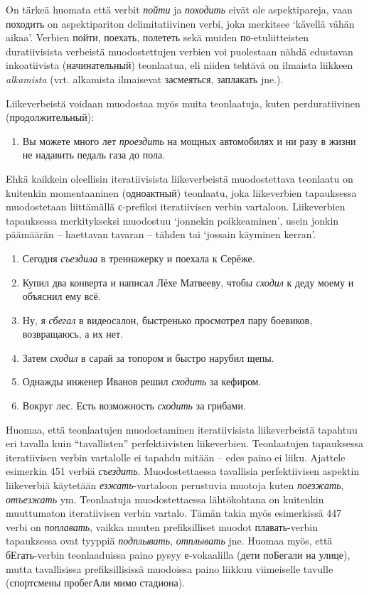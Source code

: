 \documentclass[]{scrartcl}
\providecommand{\tightlist}{%
  \setlength{\itemsep}{0pt}\setlength{\parskip}{0pt}}
\begin{document}
On tärkeä huomata että verbit \emph{пойти} ja \emph{походить} eivät ole
aspektipareja, vaan походить on aspektipariton delimitatiivinen verbi,
joka merkitsee `kävellä vähän aikaa'. Verbien пойти, поехать, полететь
sekä muiden по-etuliitteisten duratiivisista verbeistä muodostettujen
verbien voi puolestaan nähdä edustavan inkoatiivista (начинательный)
teonlaatua, eli niiden tehtävä on ilmaista liikkeen \emph{alkamista}
(vrt. alkamista ilmaisevat засмеяться, заплакать jne.).

Liikeverbeistä voidaan muodostaa myös muita teonlaatuja, kuten
perduratiivinen (продолжительный):

\begin{enumerate}
\def\labelenumi{(\arabic{enumi})}
\setcounter{enumi}{449}
\tightlist
\item
  Вы можете много лет \emph{проездить} на мощных автомобилях и ни разу в
  жизни не надавить педаль газа до пола.
\end{enumerate}

Ehkä kaikkein oleellisin iteratiivisista liikeverbeistä muodostettava
teonlaatu on kuitenkin momentaaninen (одноактный) teonlaatu, joka
liikeverbien tapauksessa muodostetaan liittämällä с-prefiksi
iteratiivisen verbin vartaloon. Liikeverbien tapauksessa merkitykseksi
muodostuu `jonnekin poikkeaminen', usein jonkin päämäärän -- haettavan
tavaran -- tähden tai `jossain käyminen kerran'.

\begin{enumerate}
\def\labelenumi{(\arabic{enumi})}
\setcounter{enumi}{450}
\tightlist
\item
  Сегодня \emph{съездила} в треннажерку и поехала к Серёже.
\item
  Купил два конверта и написал Лёхе Матвееву, чтобы \emph{сходил} к деду
  моему и объяснил ему всё.
\item
  Ну, я \emph{сбегал} в видеосалон, быстренько просмотрел пару боевиков,
  возвращаюсь, а их нет.
\item
  Затем \emph{сходил} в сарай за топором и быстро нарубил щепы.
\item
  Однажды инженер Иванов решил \emph{сходить} за кефиром.
\item
  Вокруг лес. Есть возможность \emph{сходить} за грибами.
\end{enumerate}

Huomaa, että teonlaatujen muodostaminen iteratiivisista liikeverbeistä
tapahtuu eri tavalla kuin ``tavallisten'' perfektiivisten liikeverbien.
Teonlaatujen tapauksessa iteratiivisen verbin vartalolle ei tapahdu
mitään -- edes paino ei liiku. Ajattele esimerkin 451 verbiä
\emph{съездить}. Muodostettaessa tavallisia perfektiivisen aspektin
liikeverbiä käytetään \emph{езжать}-vartaloon perustuvia muotoja kuten
\emph{поезжать}, \emph{отъезжать} ym. Teonlaatuja muodostettaessa
lähtökohtana on kuitenkin muuttumaton iteratiivisen verbin vartalo.
Tämän takia myös esimerkissä 447 verbi on \emph{поплавать}, vaikka
muuten prefiksilliset muodot плавать-verbin tapauksessa ovat tyyppiä
\emph{подплывать}, \emph{отплывать} jne. Huomaa myös, että бЕгать-verbin
teonlaaduissa paino pysyy е-vokaalilla (дети поБегали на улице), mutta
tavallisissa prefiksillisissä muodoissa paino liikkuu viimeiselle
tavulle (спортсмены пробегАли мимо стадиона).
\end{document}
